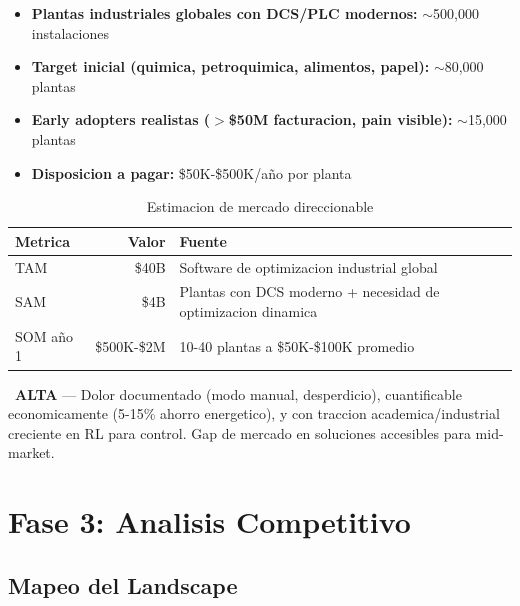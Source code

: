 \documentclass[11pt,a4paper]{article}
\newcommand{\semverde}{\textcolor{verde}{\ding{108}}}
\begin{document}
\begin{itemize}[leftmargin=*]
    \item \textbf{Plantas industriales globales con DCS/PLC modernos:} $\sim$500,000 instalaciones
    \item \textbf{Target inicial (quimica, petroquimica, alimentos, papel):} $\sim$80,000 plantas
    \item \textbf{Early adopters realistas ($>$\$50M facturacion, pain visible):} $\sim$15,000 plantas
    \item \textbf{Disposicion a pagar:} \$50K-\$500K/año por planta
\end{itemize}

\begin{table}[h]
\centering
\begin{tabular}{lrl}
\toprule
\textbf{Metrica} & \textbf{Valor} & \textbf{Fuente} \\
\midrule
TAM & \$40B & Software de optimizacion industrial global \\
SAM & \$4B & Plantas con DCS moderno + necesidad de optimizacion dinamica \\
SOM año 1 & \$500K-\$2M & 10-40 plantas a \$50K-\$100K promedio \\
\bottomrule
\end{tabular}
\caption{Estimacion de mercado direccionable}
\end{table}

\begin{veredictobox}
\semverde\ \textbf{ALTA} --- Dolor documentado (modo manual, desperdicio), cuantificable economicamente (5-15\% ahorro energetico), y con traccion academica/industrial creciente en RL para control. Gap de mercado en soluciones accesibles para mid-market.
\end{veredictobox}

\newpage
\section{Fase 3: Analisis Competitivo}

\subsection{Mapeo del Landscape}
\end{document}
